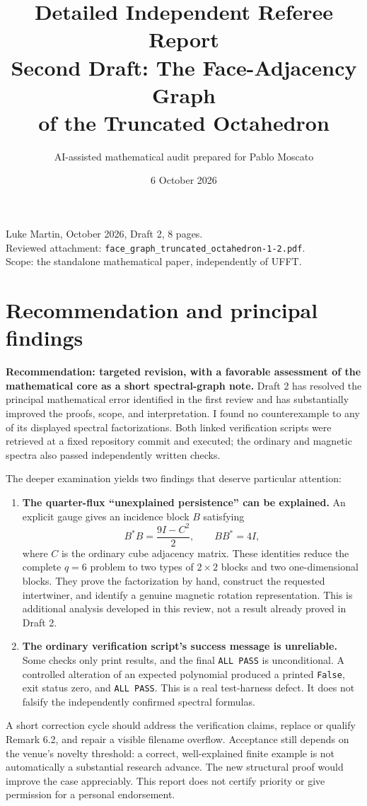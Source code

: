 \documentclass[11pt,a4paper]{article}
\title{Detailed Independent Referee Report\\\large Second Draft: The Face-Adjacency Graph\\of the Truncated Octahedron}
\author{AI-assisted mathematical audit prepared for Pablo Moscato}
\date{6 October 2026}
\begin{document}
\maketitle
\begin{center}\small
Luke Martin, October 2026, Draft 2, 8 pages.\\
Reviewed attachment: \texttt{face\_graph\_truncated\_octahedron-1-2.pdf}.\\
Scope: the standalone mathematical paper, independently of UFFT.
\end{center}

\section{Recommendation and principal findings}
\textbf{Recommendation: targeted revision, with a favorable assessment of the mathematical core as a short spectral-graph note.} Draft 2 has resolved the principal mathematical error identified in the first review and has substantially improved the proofs, scope, and interpretation. I found no counterexample to any of its displayed spectral factorizations. Both linked verification scripts were retrieved at a fixed repository commit and executed; the ordinary and magnetic spectra also passed independently written checks.

The deeper examination yields two findings that deserve particular attention:
\begin{enumerate}
\item \textbf{The quarter-flux ``unexplained persistence'' can be explained.} An explicit gauge gives an incidence block $B$ satisfying
\[
 B^*B=\frac{9I-C^2}{2},\qquad BB^*=4I,
\]
where $C$ is the ordinary cube adjacency matrix. These identities reduce the complete $q=6$ problem to two types of $2\times2$ blocks and two one-dimensional blocks. They prove the factorization by hand, construct the requested intertwiner, and identify a genuine magnetic rotation representation. This is additional analysis developed in this review, not a result already proved in Draft 2.
\item \textbf{The ordinary verification script's success message is unreliable.} Some checks only print results, and the final \texttt{ALL PASS} is unconditional. A controlled alteration of an expected polynomial produced a printed \texttt{False}, exit status zero, and \texttt{ALL PASS}. This is a real test-harness defect. It does not falsify the independently confirmed spectral formulas.
\end{enumerate}
A short correction cycle should address the verification claims, replace or qualify Remark 6.2, and repair a visible filename overflow. Acceptance still depends on the venue's novelty threshold: a correct, well-explained finite example is not automatically a substantial research advance. The new structural proof would improve the case appreciably. This report does not certify priority or give permission for a personal endorsement.
\end{document}
